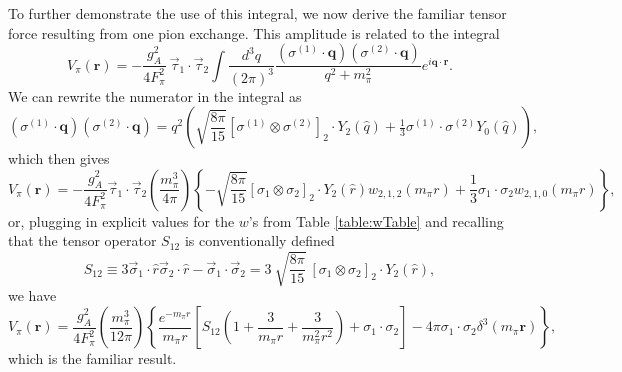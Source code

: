 \documentclass[%
 preprint,
 amsmath,amssymb,
 aps,
]{revtex4-1}
\newcommand{\taudot}{\vec{\tau}_1\cdot\vec{\tau}_2}
\newcommand{\sigmadot}{\vec{\sigma}_1\cdot\vec{\sigma}_2}
\newcommand{\w}[4]{w_{#1,#2,#3}(#4)}
\begin{document}
To further demonstrate the use of this integral, we now derive the familiar tensor force resulting from one pion exchange. This amplitude is related to the integral
\begin{equation} 
V_\pi( \mathbf{r}) =  -\frac{g_A^2 }{4 F_\pi^2} \:\taudot \int \frac{d^3 q } {(2 \pi)^3 } \frac{(\sigma^{(1)} \cdot \mathbf{q} ) (\sigma^{(2)} \cdot \mathbf{q} ) } {q^2+m_\pi^2} e^{i \mathbf{q} \cdot \mathbf{r} }. 
\end{equation}
We can rewrite the numerator in the integral as
\begin{equation} (\sigma^{(1)} \cdot \mathbf{q}) ( \sigma^{(2)} \cdot \mathbf{q} )= q^2 \left(\sqrt{\frac{8\pi}{15}} [\sigma^{(1)} \otimes \sigma^{(2)}]_2 \cdot Y_2(\hat{q}) + \tfrac{1}{3} \sigma^{(1)} \cdot \sigma^{(2)}  Y_0(\hat{q}) \right),\end{equation}
which then gives
\begin{equation} 
V_\pi( \mathbf{r}) = - \frac{g_A^2 }{4 F_\pi^2} \taudot \left(\frac{m_\pi^3}{4 \pi}\right) \left\{ - \sqrt{\frac{8\pi}{15}} [\sigma_1 \otimes \sigma_2]_2 \cdot Y_2(\hat{r}) \w{2}{1}{2}{m_\pi r} + \frac{1}{3} \sigma_1 \cdot \sigma_2 \w{2}{1}{0}{m_\pi r } \right\},  \end{equation}
or, plugging in explicit values for the $w$'s from Table \ref{table:wTable} and recalling that the tensor operator $S_{12}$ is conventionally defined
\begin{equation}
S_{12} \equiv   3\vec{\sigma}_1\cdot \hat{r}\vec{\sigma}_2\cdot \hat{r} -\sigmadot = 3\:\sqrt{\frac{8\pi}{15}} \:[\sigma_1 \otimes \sigma_2]_2 \cdot Y_2(\hat{r}) , 
\end{equation}
we have
\begin{equation} V_\pi( \mathbf{r})= \frac{g_A^2 }{4 F_\pi^2}  \left(\frac{m_\pi^3}{12 \pi}\right) \left\{ \frac{e^{-m_\pi r}}{m_\pi r} \left[ S_{12}\left(1+\frac{3}{m_\pi r}+ \frac{3}{m_\pi^2 r^2} \right) +  \sigma_1 \cdot \sigma_2 \right] - 4\pi  \sigma_1 \cdot \sigma_2 \delta^3(m_\pi \mathbf{r}) \right\}, 
\end{equation}
which is the familiar result.
\end{document}
